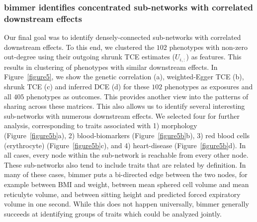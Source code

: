 \documentclass{article}
\begin{document}
\subsubsection*{bimmer identifies concentrated sub-networks with correlated downstream effects}
Our final goal was to identify densely-connected sub-networks with correlated downstream effects.
To this end, we clustered the $102$ phenotypes with non-zero out-degree using their
outgoing shrunk TCE estimates ($U_{i, :}$) as features.
This results in clustering of phenotypes with similar downstream effects.
In Figure~\ref{figure5}, we show the genetic correlation (a), weighted-Egger TCE (b), shrunk TCE (c) and
inferred DCE (d) for these $102$ phenotypes as exposures and all $405$ phenotypes as outcomes.
This provides another view into the patterns of sharing across these matrices.
This also allows us to identify several interesting sub-networks
with numerous downstream effects. We selected four
for further analysis, corresponding to traits associated with 1) morphology (Figure~\ref{figure5b}a),
2) blood-biomarkers (Figure~\ref{figure5b}b), 3) red blood cells (erythrocyte) (Figure~\ref{figure5b}c),
and 4)  heart-disease (Figure~\ref{figure5b}d).
In all cases, every node within the sub-network is reachable from every other node. 
These sub-networks also tend to include traits that are related by definition. In many of these cases,
bimmer puts a bi-directed edge between the two nodes, for example between BMI and weight,
between mean sphered cell volume and mean reticulyte volume, and between
sitting height and predicted forced expiratory volume in one second. While this does not happen universally,
bimmer generally succeeds at identifying groups of traits which could be analyzed jointly. 
\end{document}
